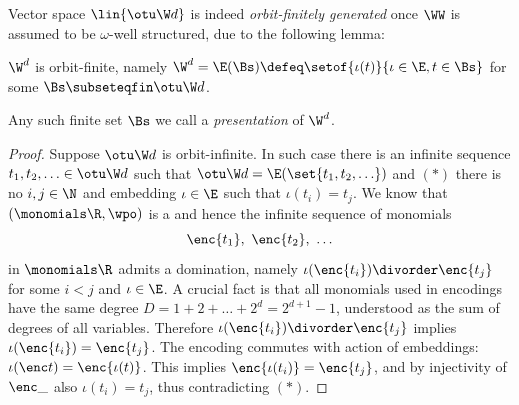 
Vector space $\lin{\otu \W d}$ is indeed \emph{orbit-finitely generated} once $\WW$ is assumed to be
$\omega$-well structured, due to the following lemma:
\begin{lemma}
 \label{lem:of}
$\W^d$ is orbit-finite, namely 
$\W^d = \E(\Bs) \defeq \setof{\iota(t)}{\iota\in\E, t\in\Bs}$ for some  $\Bs\subseteqfin \otu \W d$.
\end{lemma}
%
Any such finite set $\Bs$ we call a \emph{presentation} of  $\W^d$.
%
\begin{proof}
Suppose $\otu \W d$ is orbit-infinite.
In such case
there is an infinite sequence $t_1, t_2, \ldots \in \otu \W d$ such that
$\otu \W d = \E(\set{t_1,t_2, \ldots})$ and
$(*)$ there is no $i,j\in\N$ and embedding $\iota\in\E$ such that $\iota(t_i) = t_j$.
We know that $(\monomials \R, \wpo)$ is a \wqo and hence
the infinite sequence of monomials
\[
\enc {t_1}, \ \enc{t_2}, \ \ldots
\]
in $\monomials \R$
admits a domination, namely $\iota(\enc{t_i}) \divorder \enc{t_j}$ for some $i<j$ and $\iota \in \E$.
A crucial fact is that all monomials used in encodings 
have the same degree $D=1 + 2 + \ldots + 2^d = 2^{d+1}-1$,
understood as the sum of degrees of all variables.
Therefore $\iota(\enc{t_i}) \divorder \enc{t_j}$ implies $\iota(\enc{t_i}) = \enc{t_j}$.
The encoding %
commutes with action of embeddings:
$\iota(\enc t) = \enc{\iota(t)}$.
This implies $\enc{\iota(t_i)} = \enc{t_j}$, and by injectivity of $\enc \_$ also
$\iota(t_i) = t_j$, thus contradicting $(*)$.
\end{proof}



